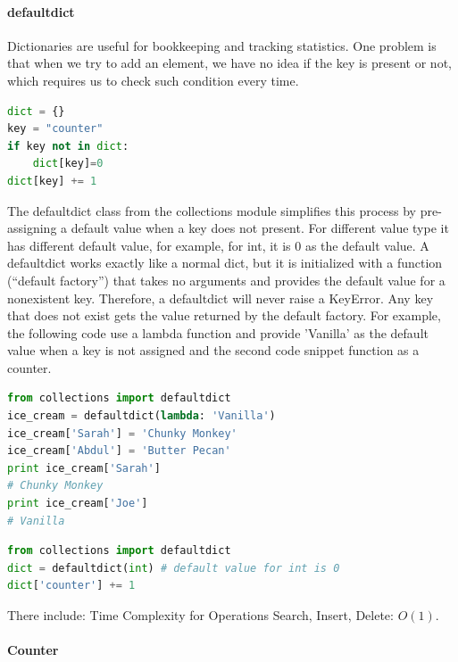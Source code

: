 \documentclass[../main.tex]{subfiles}
\begin{document}
\paragraph{defaultdict} Dictionaries are useful for bookkeeping and tracking statistics. One problem is that when we try to add an element, we have no idea if the key is present or not, which requires us to check such condition every time.
\begin{lstlisting}[language = Python]
dict = {}
key = "counter"
if key not in dict:
    dict[key]=0
dict[key] += 1
\end{lstlisting}
The defaultdict class from the collections module simplifies this process by pre-assigning a default value when a key does not present. For different value type it has different default value, for example, for int, it is 0 as the default value. A defaultdict works exactly like a normal dict, but it is initialized with a function (“default factory”) that takes no arguments and provides the default value for a nonexistent key. Therefore, a defaultdict will never raise a KeyError. Any key that does not exist gets the value returned by the default factory. For example, the following code use a lambda function and provide 'Vanilla' as the default value when a key is not assigned and the second code snippet function as a counter. 
\begin{lstlisting}[language=Python]
from collections import defaultdict
ice_cream = defaultdict(lambda: 'Vanilla')
ice_cream['Sarah'] = 'Chunky Monkey'
ice_cream['Abdul'] = 'Butter Pecan'
print ice_cream['Sarah']
# Chunky Monkey
print ice_cream['Joe']
# Vanilla
\end{lstlisting}

\begin{lstlisting}[language = Python]
from collections import defaultdict
dict = defaultdict(int) # default value for int is 0
dict['counter'] += 1
\end{lstlisting}
There include: 
Time Complexity for Operations Search, Insert, Delete: $O(1)$.

\paragraph{Counter}
\end{document}
